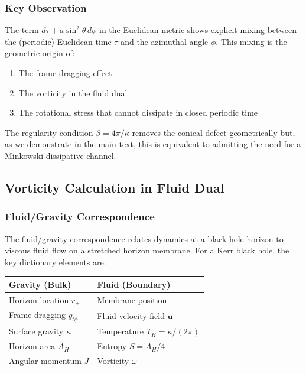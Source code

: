 \documentclass[11pt]{article}
\begin{document}
\subsubsection{Key Observation}

The term $d\tau + a\sin^2\theta\, d\phi$ in the Euclidean metric shows explicit mixing between the (periodic) Euclidean time $\tau$ and the azimuthal angle $\phi$. This mixing is the geometric origin of:
\begin{enumerate}
\item The frame-dragging effect
\item The vorticity in the fluid dual
\item The rotational stress that cannot dissipate in closed periodic time
\end{enumerate}

The regularity condition $\beta = 4\pi/\kappa$ removes the conical defect geometrically but, as we demonstrate in the main text, this is equivalent to admitting the need for a Minkowski dissipative channel.

\subsection{Vorticity Calculation in Fluid Dual}
\label{subsec:vorticity-dual}

\subsubsection{Fluid/Gravity Correspondence}

The fluid/gravity correspondence relates dynamics at a black hole horizon to viscous fluid flow on a stretched horizon membrane. For a Kerr black hole, the key dictionary elements are:

\begin{center}
\begin{tabular}{|l|l|}
\hline
\textbf{Gravity (Bulk)} & \textbf{Fluid (Boundary)} \\
\hline
Horizon location $r_+$ & Membrane position \\
Frame-dragging $g_{t\phi}$ & Fluid velocity field $\mathbf{u}$ \\
Surface gravity $\kappa$ & Temperature $T_H = \kappa/(2\pi)$ \\
Horizon area $A_H$ & Entropy $S = A_H/4$ \\
Angular momentum $J$ & Vorticity $\omega$ \\
\hline
\end{tabular}
\end{center}
\end{document}
